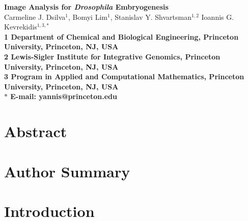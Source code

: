 \documentclass[10pt]{article}
\date{}
\begin{document}
\begin{flushleft}
{\Large
\textbf{Image Analysis for {\em Drosophila} Embryogenesis}
}
\\
Carmeline J. Dsilva$^{1}$,
Bomyi Lim$^{1}$,
Stanislav Y. Shvartsman$^{1,2}$
Ioannis G. Kevrekidis$^{1,3,\ast}$
\\
\bf{1} Department of Chemical and Biological Engineering, Princeton University, Princeton, NJ, USA
\\
\bf{2} Lewis-Sigler Institute for Integrative Genomics, Princeton University, Princeton, NJ, USA
\\
\bf{3} Program in Applied and Computational Mathematics, Princeton University, Princeton, NJ, USA
\\
$\ast$ E-mail: yannis@princeton.edu
\end{flushleft}

\section*{Abstract}

\section*{Author Summary}

\section*{Introduction}
\end{document}
